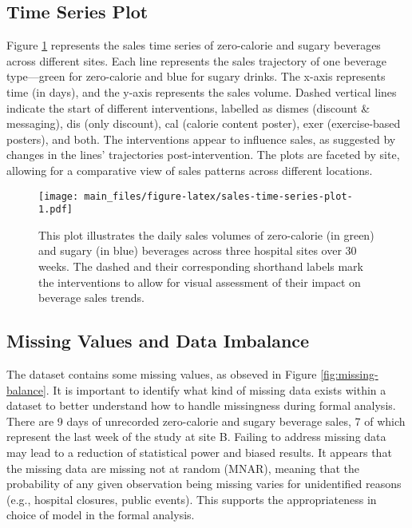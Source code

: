 \documentclass[
]{article}
\begin{document}
\hypertarget{time-series-plot}{%
\subsection{Time Series Plot}\label{time-series-plot}}

Figure \ref{fig:sales-time-series-plot} represents the sales time series of zero-calorie and sugary beverages across different sites. Each line represents the sales trajectory of one beverage type---green for zero-calorie and blue for sugary drinks. The x-axis represents time (in days), and the y-axis represents the sales volume. Dashed vertical lines indicate the start of different interventions, labelled as dismes (discount \& messaging), dis (only discount), cal (calorie content poster), exer (exercise-based posters), and both. The interventions appear to influence sales, as suggested by changes in the lines' trajectories post-intervention. The plots are faceted by site, allowing for a comparative view of sales patterns across different locations.

\begin{figure}
\centering
\texttt{[image: main\_files/figure-latex/sales-time-series-plot-1.pdf]}
\caption{\label{fig:sales-time-series-plot}This plot illustrates the daily sales volumes of zero-calorie (in green) and sugary (in blue) beverages across three hospital sites over 30 weeks. The dashed and their corresponding shorthand labels mark the interventions to allow for visual assessment of their impact on beverage sales trends.}
\end{figure}

\hypertarget{missing-values-and-data-imbalance}{%
\subsection{Missing Values and Data Imbalance}\label{missing-values-and-data-imbalance}}

The dataset contains some missing values, as obseved in Figure \ref{fig:missing-balance}. It is important to identify what kind of missing data exists within a dataset to better understand how to handle missingness during formal analysis. There are 9 days of unrecorded zero-calorie and sugary beverage sales, 7 of which represent the last week of the study at site B. Failing to address missing data may lead to a reduction of statistical power and biased results. It appears that the missing data are missing not at random (MNAR), meaning that the probability of any given observation being missing varies for unidentified reasons (e.g., hospital closures, public events). This supports the appropriateness in choice of model in the formal analysis.
\end{document}
